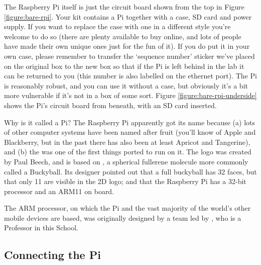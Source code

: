 The Raspberry Pi itself is just the circuit board shown from the top in Figure \ref{figure:bare-rpi}. Your kit contains a Pi together with a case, SD card and power supply. If you want to replace the case with one in a different style you're welcome to do so (there are plenty available to buy online, and lots of people have made their own unique ones just for the fun of it). If you do put it in your own case, please remember to transfer the `sequence number' sticker we've placed on the original box to the new box so that if the Pi is left behind in the lab it can be returned to you (this number is also labelled on the ethernet port). The Pi is reasonably robust, and you can use it without a case, but obviously it's a bit more vulnerable if it's not in a box of some sort. Figure \ref{figure:bare-rpi-underside} shows the Pi's circuit board from beneath, with an SD card inserted.

\begin{rpi}{Why is it called a Pi?}
  The Raspberry Pi apparently got its name because (a) lots of other computer systems have been named after fruit (you'll know of Apple and Blackberry, but in the past there has also been at least Apricot and Tangerine), and (b) the  was one of the first things ported to run on it. The logo was created by Paul Beech, and is based on , a spherical fullerene molecule more commonly called a Buckyball. Its designer pointed out that a full buckyball has 32 faces, but that only 11 are visible in the 2D logo; and that the Raspberry Pi has a 32-bit processor and an ARM11 on board.

The ARM processor, on which the Pi and the vast majority of the world's other mobile devices are based, was originally designed by a team led by , who is a Professor in this School.
\end{rpi}

\subsection{Connecting the Pi}
\label{sec:connecting-pi}


